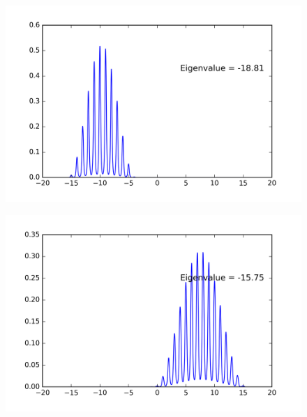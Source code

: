 \begin{figure}[!htbh]
\centering
\begin{minipage}{.45\textwidth}
  \centering
  \includegraphics[width=1.1\linewidth]{floatingPrecision/oldPot100discrete_1th_Lowest0_3.png}
  \label{fig:oldPo_0.4}
\end{minipage}\qquad
\begin{minipage}{.45\textwidth}
  \centering
  \includegraphics[width=1.1\linewidth]{floatingPrecision/oldPot100discrete_1th_Lowest0_4.png}
  \label{fig:oldPo_0.3}
\end{minipage}
\end{figure}

